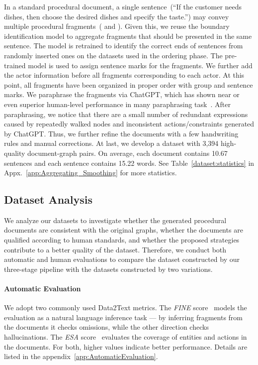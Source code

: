 In a standard procedural document, a single sentence~(``If the customer needs dishes, then choose the desired dishes and specify the taste.'') may convey multiple procedural fragments~( and ). Given this, we reuse the boundary identification model to aggregate fragments that should be presented in the same sentence. The model is retrained to identify the correct ends of sentences from randomly inserted ones on the datasets used in the ordering phase. The pre-trained model is used to assign sentence marks for the fragments.
We further add the actor information before all fragments corresponding to each actor. At this point, all fragments have been organized in proper order with group and sentence marks. We paraphrase the fragments via ChatGPT, which has shown near or even superior human-level performance in many paraphrasing task~\cite{chui2023chatgpt}. After paraphrasing, we notice that there are a small number of redundant expressions caused by repeatedly walked nodes and inconsistent actions/constraints generated by ChatGPT. Thus, we further refine the documents with a few handwriting rules and manual corrections. At last, we develop a dataset with 3,394 high-quality document-graph pairs. On average, each document contains 10.67 sentences and each sentence contains 15.22 words. See Table~\ref{dataset:statistics} in Appx.~\ref{app:Aggregating_Smoothing} for more statistics.


\subsection{Dataset Analysis
}

\label{Dataset Quality Evaluation}
We analyze our datasets to investigate whether the generated procedural documents are consistent with the original graphs, whether the documents are qualified according to human standards, and whether the proposed strategies contribute to a better quality of the dataset. Therefore, we conduct both automatic and human evaluations to compare the dataset constructed by our three-stage pipeline with the datasets constructed by two variations.

\paragraph{Automatic Evaluation}
 We adopt two commonly used Data2Text metrics. The \textit{FINE} score~\cite{faille2021entity} models the evaluation as a natural language inference task --- by inferring fragments from the documents it checks omissions, while the other direction checks hallucinations. The \textit{ESA} score~\cite{faille2021entity} evaluates the coverage of entities and actions in the documents. For both, higher values indicate better performance. Details are listed in the appendix~\ref{app:AutomaticEvaluation}.

